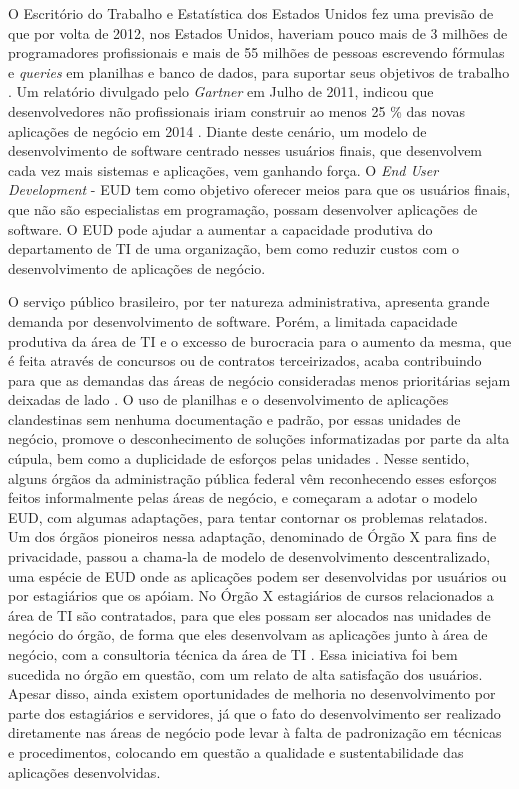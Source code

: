 O Escritório do Trabalho e Estatística dos Estados Unidos fez uma previsão de que por volta de 2012, nos Estados Unidos, haveriam pouco mais de 3 milhões de programadores profissionais e mais de 55 milhões de pessoas escrevendo fórmulas e \textit{queries} em planilhas e banco de dados, para suportar seus objetivos de trabalho \cite{scaffidi2005}. Um relatório divulgado pelo \textit{Gartner} em Julho de 2011, indicou que desenvolvedores não profissionais iriam construir ao menos 25 \% das novas aplicações de negócio em 2014 \cite{paterno2013}. Diante deste cenário, um modelo de desenvolvimento de software centrado nesses usuários finais, que desenvolvem cada vez mais sistemas e aplicações, vem ganhando força. O \textit{End User Development} - EUD tem como objetivo oferecer meios para que os usuários finais, que não são especialistas em programação, possam desenvolver aplicações de software. O EUD pode ajudar a aumentar a capacidade produtiva do departamento de TI de uma organização, bem como reduzir custos com o desenvolvimento de aplicações de negócio.

O serviço público brasileiro, por ter natureza administrativa, apresenta grande demanda por desenvolvimento de software. Porém, a limitada capacidade produtiva da área de TI e o excesso de burocracia para o aumento da mesma, que é feita através de concursos ou de contratos terceirizados, acaba contribuindo para que as demandas das áreas de negócio consideradas menos prioritárias sejam deixadas de lado \cite{artigoTcuGovTI}. O uso de planilhas e o desenvolvimento de aplicações clandestinas sem nenhuma documentação e padrão, por essas unidades de negócio, promove o desconhecimento de soluções informatizadas por parte da alta cúpula, bem como a duplicidade de esforços pelas unidades \cite{slideTCU}. Nesse sentido, alguns órgãos da administração pública federal vêm reconhecendo esses esforços feitos informalmente pelas áreas de negócio, e começaram a adotar o modelo EUD, com algumas adaptações, para tentar contornar os problemas relatados. Um dos órgãos pioneiros nessa adaptação, denominado de Órgão X para fins de privacidade, passou a chama-la de modelo de desenvolvimento descentralizado, uma espécie de EUD onde as aplicações podem ser desenvolvidas por usuários ou por estagiários que os apóiam. No Órgão X estagiários de cursos relacionados a área de TI são contratados, para que eles possam ser alocados nas unidades de negócio do órgão, de forma que eles desenvolvam as aplicações junto à área de negócio, com a consultoria técnica da área de TI \cite{slideTCU}. Essa iniciativa foi bem sucedida no órgão em questão, com um relato de alta satisfação dos usuários. Apesar disso, ainda existem oportunidades de melhoria no desenvolvimento por parte dos estagiários e servidores, já que o fato do desenvolvimento ser realizado diretamente nas áreas de negócio pode levar à falta de padronização em técnicas e procedimentos, colocando em questão a qualidade e sustentabilidade das aplicações desenvolvidas. 

